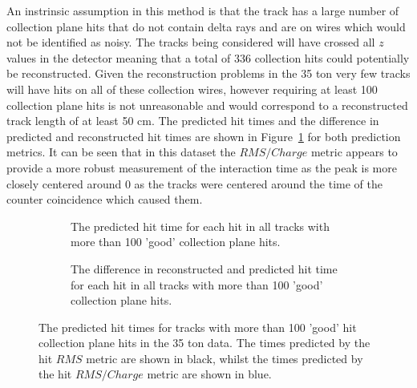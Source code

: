 An instrinsic assumption in this method is that the track has a large number of collection plane hits that do not contain delta rays and are on wires which would not be identified as noisy. The tracks being considered will have crossed all $z$ values in the detector meaning that a total of 336 collection hits could potentially be reconstructed. Given the reconstruction problems in the 35 ton very few tracks will have hits on all of these collection wires, however requiring at least 100 collection plane hits is not unreasonable and would correspond to a reconstructed track length of at least 50 cm. The predicted hit times and the difference in predicted and reconstructed hit times are shown in Figure~\ref{fig:DiffDataPredHit} for both prediction metrics. It can be seen that in this dataset the $RMS/Charge$ metric appears to provide a more robust measurement of the interaction time as the peak is more closely centered around 0 as the tracks were centered around the time of the counter coincidence which caused them. 

\begin{figure}[h!]
  \centering
  \begin{subfigure}{0.45\textwidth}
    \centering
    \caption{The predicted hit time for each hit in all tracks with more than 100 'good' collection plane hits.}
  \end{subfigure}
  \hspace{0.08\textwidth}
  \begin{subfigure}{0.45\textwidth}
    \centering
    \caption{The difference in reconstructed and predicted hit time for each hit in all tracks with more than 100 'good' collection plane hits.}
  \end{subfigure}
  \caption[The predicted hit times for tracks with more than 100 'good' hit collection plane hits in the 35 ton data]
          {The predicted hit times for tracks with more than 100 'good' hit collection plane hits in the 35 ton data. The times predicted by the hit $RMS$ metric are shown in black, whilst the times predicted by the hit $RMS/Charge$ metric are shown in blue.}
          \label{fig:DiffDataPredHit}
\end{figure}

